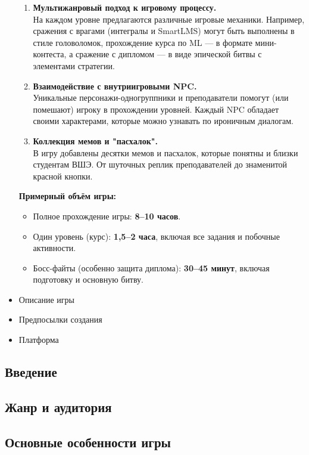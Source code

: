 \documentclass{article}
\begin{document}
\begin{itemize}
\begin{enumerate}
    \item \textbf{Мультижанровый подход к игровому процессу.} \\
    На каждом уровне предлагаются различные игровые механики. Например, сражения с врагами (интегралы и SmartLMS) могут быть выполнены в стиле головоломок, прохождение курса по ML --- в формате мини-контеста, а сражение с дипломом --- в виде эпической битвы с элементами стратегии.

    \item \textbf{Взаимодействие с внутриигровыми NPC.} \\
    Уникальные персонажи-одногруппники и преподаватели помогут (или помешают) игроку в прохождении уровней. Каждый NPC обладает своими характерами, которые можно узнавать по ироничным диалогам.

    \item \textbf{Коллекция мемов и "пасхалок".} \\
    В игру добавлены десятки мемов и пасхалок, которые понятны и близки студентам ВШЭ. От шуточных реплик преподавателей до знаменитой красной кнопки.
    \end{enumerate}

    \textbf{Примерный объём игры:}

    \begin{itemize}
        \item Полное прохождение игры: \textbf{8--10 часов}.
        \item Один уровень (курс): \textbf{1,5--2 часа}, включая все задания и побочные активности.
        \item Босс-файты (особенно защита диплома): \textbf{30--45 минут}, включая подготовку и основную битву.
    \end{itemize}
    \item Описание игры
    \item Предпосылки создания
    \item Платформа
\end{itemize}
\subsection{Введение}

\subsection{Жанр и аудитория}

\subsection{Основные особенности игры}
\end{document}
